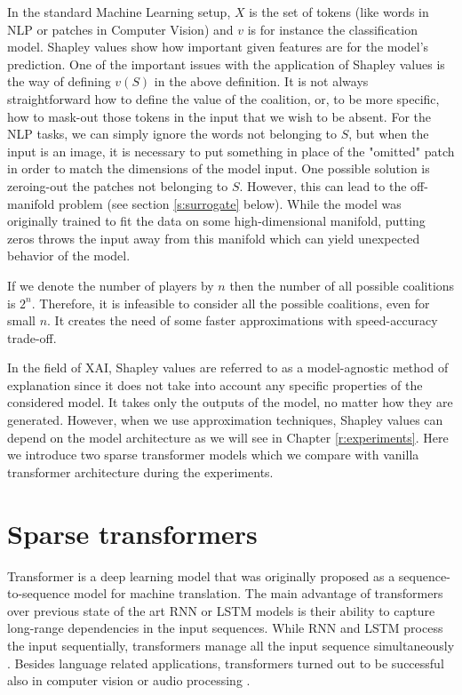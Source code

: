 \documentclass[magisterska,en]{pracamgr}
\begin{document}
In the standard Machine Learning setup, $X$ is the set of tokens (like words in NLP or patches in Computer Vision) and $v$ is for instance the classification model. Shapley values show how important given features are for the model's prediction. One of the important issues with the application of Shapley values is the way of defining $v(S)$ in the above definition. It is not always straightforward how to define the value of the coalition, or, to be more specific, how to mask-out those tokens in the input that we wish to be absent. For the NLP tasks, we can simply ignore the words not belonging to $S$, but when the input is an image, it is necessary to put something in place of the "omitted" patch in order to match the dimensions of the model input. One possible solution is zeroing-out the patches not belonging to $S$. However, this can lead to the off-manifold problem (see section \ref{s:surrogate} below). While the model was originally trained to fit the data on some high-dimensional manifold, putting zeros throws the input away from this manifold which can yield unexpected behavior of the model.



If we denote the number of players by $n$ then the number of all possible coalitions is $2^n$. Therefore, it is infeasible to consider all the possible coalitions, even for small $n$. It creates the need of some faster approximations with speed-accuracy trade-off.


In the field of XAI, Shapley values are referred to as a model-agnostic method of explanation since it does not take into account any specific properties of the considered model. It takes only the outputs of the model, no matter how they are generated. However, when we use approximation techniques, Shapley values can depend on the model architecture as we will see in Chapter \ref{r:experiments}. Here we introduce two sparse transformer models which we compare with vanilla transformer architecture during the experiments.







\section{Sparse transformers}
Transformer \cite{DBLP:conf/nips/VaswaniSPUJGKP17} is a deep learning model that was originally proposed as a sequence-to-sequence model \cite{DBLP:conf/nips/SutskeverVL14} for machine translation. The main advantage of transformers over previous state of the art RNN or LSTM models is their ability to capture long-range dependencies in the input sequences. While RNN and LSTM process the input sequentially, transformers manage all the input sequence simultaneously \cite{DBLP:journals/corr/abs-2306-07303}.
Besides language related applications, transformers turned out to be successful also in computer vision \cite{DBLP:conf/iclr/DosovitskiyB0WZ21} or audio processing \cite{DBLP:journals/corr/abs-2106-04554}.
\end{document}
